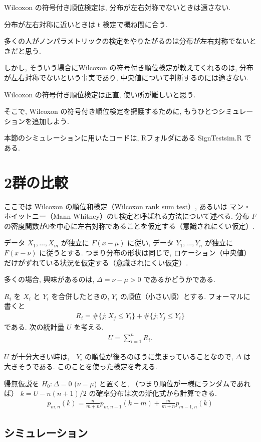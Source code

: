 \documentclass[12pt]{jsarticle}
\begin{document}
Wilcoxon の符号付き順位検定は, 分布が左右対称でないときは適さない. 

分布が左右対称に近いときは t 検定で概ね間に合う. 

多くの人がノンパラメトリックの検定をやりたがるのは分布が左右対称でないときだと思う.

しかし, そういう場合にWilcoxon の符号付き順位検定が教えてくれるのは, 分布が左右対称でないという事実であり, 中央値について判断するのには適さない.

 Wilcoxon の符号付き順位検定は正直, 使い所が難しいと思う.
 
 そこで,  Wilcoxon の符号付き順位検定を擁護するために, もうひとつシミュレーションを追加しよう.
 
 本節のシミュレーションに用いたコードは, Rフォルダにある SignTestsim.R である.
 
 \section{2群の比較}

ここでは Wilcoxon の順位和検定（Wilcoxon rank sum test）, あるいは マン・ホイットニー（Mann-Whitney）のU検定と呼ばれる方法について述べる. 
分布 $F$ の密度関数が0を中心に左右対称であることを仮定する（意識されにくい仮定）.

データ $X_1, \ldots , X_m$ が独立に $F(x-\mu)$ に従い, データ $Y_1, \ldots , Y_n$ が独立に $F(x-\nu)$ に従うとする. つまり分布の形状は同じで, ロケーション（中央値）だけがずれている状況を仮定する（意識されにくい仮定）.

多くの場合, 興味があるのは,  $\Delta=\nu-\mu>0$ であるかどうかである. 

$R_i$ を $X_i$ と $Y_i$ を合併したときの, $Y_i$ の順位（小さい順）とする.
フォーマルに書くと
\begin{align}
R_i = \#\{j; X_j\le Y_i\}+\#\{j; Y_j\le Y_i\}
\end{align}
である. 
次の統計量 $U$ を考える. 
\begin{align}
U = \sum_{i=1}^{n}R_i.
\end{align}

$U$ が十分大きい時は,　$Y_i$ の順位が後ろのほうに集まっていることなので, $\Delta$ は大きそうである.
このことを使った検定を考える.

帰無仮説を $H_0: \Delta=0$ ($\nu=\mu$) と置くと, （つまり順位が一様にランダムであれば） $k=U-n(n+1)/2$ の確率分布は次の漸化式から計算できる.
\begin{align}
p_{m,n}(k)=\frac{n}{m+n} p_{m,n-1}(k-m)+\frac{m}{m+n} p_{m-1,n}(k)
\end{align}

\subsection{シミュレーション}
\end{document}
